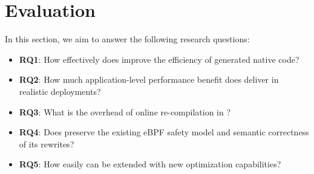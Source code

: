 










\section{Evaluation}
\label{sec:evaluation}

In this section, we aim to answer the following research questions:
\begin{itemize}
    \item \textbf{RQ1}: How effectively does \tool improve the efficiency of generated native code?
    \item \textbf{RQ2}: How much application-level performance benefit does \tool deliver in realistic deployments?
    \item \textbf{RQ3}: What is the overhead of online re-compilation in \tool?
    \item \textbf{RQ4}: Does \tool preserve the existing eBPF safety model and semantic correctness of its rewrites?
    \item \textbf{RQ5}: How easily can \tool be extended with new optimization capabilities?
\end{itemize}

